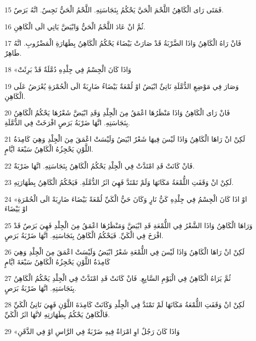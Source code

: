 \par 15 فَمَتَى رَاى الْكَاهِنُ اللَّحْمَ الْحَيَّ يَحْكُمُ بِنَجَاسَتِهِ. اللَّحْمُ الْحَيُّ نَجِسٌ. انَّهُ بَرَصٌ.
\par 16 ثُمَّ انْ عَادَ اللَّحْمُ الْحَيُّ وَابْيَضَّ يَاتِي الَى الْكَاهِنِ.
\par 17 فَانْ رَاهُ الْكَاهِنُ وَاذَا الضَّرْبَةُ قَدْ صَارَتْ بَيْضَاءَ يَحْكُمُ الْكَاهِنُ بِطَهَارَةِ الْمَضْرُوبِ. انَّهُ طَاهِرٌ.
\par 18 «وَاذَا كَانَ الْجِسْمُ فِي جِلْدِهِ دُمَّلَةٌ قَدْ بَرِئَتْ
\par 19 وَصَارَ فِي مَوْضِعِ الدُّمَّلَةِ نَاتِئٌ ابْيَضُ اوْ لُمْعَةٌ بَيْضَاءُ ضَارِبَةٌ الَى الْحُمْرَةِ يُعْرَضُ عَلَى الْكَاهِنِ.
\par 20 فَانْ رَاى الْكَاهِنُ وَاذَا مَنْظَرُهَا اعْمَقُ مِنَ الْجِلْدِ وَقَدِ ابْيَضَّ شَعْرُهَا يَحْكُمُ الْكَاهِنُ بِنَجَاسَتِهِ. انَّهَا ضَرْبَةُ بَرَصٍ افْرَخَتْ فِي الدُّمَّلَةِ.
\par 21 لَكِنْ انْ رَاهَا الْكَاهِنُ وَاذَا لَيْسَ فِيهَا شَعْرٌ ابْيَضُ وَلَيْسَتْ اعْمَقَ مِنَ الْجِلْدِ وَهِيَ كَامِدَةُ اللَّوْنِ يَحْجِزُهُ الْكَاهِنُ سَبْعَةَ ايَّامٍ.
\par 22 فَانْ كَانَتْ قَدِ امْتَدَّتْ فِي الْجِلْدِ يَحْكُمُ الْكَاهِنُ بِنَجَاسَتِهِ. انَّهَا ضَرْبَةٌ.
\par 23 لَكِنْ انْ وَقَفَتِ اللُّمْعَةُ مَكَانَهَا وَلَمْ تَمْتَدَّ فَهِيَ اثَرُ الدُّمَّلَةِ. فَيَحْكُمُ الْكَاهِنُ بِطَهَارَتِهِ.
\par 24 «اوْ اذَا كَانَ الْجِسْمُ فِي جِلْدِهِ كَيُّ نَارٍ وَكَانَ حَيُّ الْكَيِّ لُمْعَةً بَيْضَاءَ ضَارِبَةً الَى الْحُمْرَةِ اوْ بَيْضَاءَ
\par 25 وَرَاهَا الْكَاهِنُ وَاذَا الشَّعْرُ فِي اللُّمْعَةِ قَدِ ابْيَضَّ وَمَنْظَرُهَا اعْمَقُ مِنَ الْجِلْدِ فَهِيَ بَرَصٌ قَدْ افْرَخَ فِي الْكَيِّ. فَيَحْكُمُ الْكَاهِنُ بِنَجَاسَتِهِ. انَّهَا ضَرْبَةُ بَرَصٍ.
\par 26 لَكِنْ انْ رَاهَا الْكَاهِنُ وَاذَا لَيْسَ فِي اللُّمْعَةِ شَعْرٌ ابْيَضُ وَلَيْسَتْ اعْمَقَ مِنَ الْجِلْدِ وَهِيَ كَامِدَةُ اللَّوْنِ يَحْجِزُهُ الْكَاهِنُ سَبْعَةَ ايَّامٍ
\par 27 ثُمَّ يَرَاهُ الْكَاهِنُ فِي الْيَوْمِ السَّابِعِ. فَانْ كَانَتْ قَدِ امْتَدَّتْ فِي الْجِلْدِ يَحْكُمُ الْكَاهِنُ بِنَجَاسَتِهِ. انَّهَا ضَرْبَةُ بَرَصٍ.
\par 28 لَكِنْ انْ وَقَفَتِ اللُّمْعَةُ مَكَانَهَا لَمْ تَمْتَدَّ فِي الْجِلْدِ وَكَانَتْ كَامِدَةَ اللَّوْنِ فَهِيَ نَاتِئُ الْكَيِّ فَالْكَاهِنُ يَحْكُمُ بِطَهَارَتِهِ لانَّهَا اثَرُ الْكَيِّ.
\par 29 «وَاذَا كَانَ رَجُلٌ اوِ امْرَاةٌ فِيهِ ضَرْبَةٌ فِي الرَّاسِ اوْ فِي الذَّقَنِ
